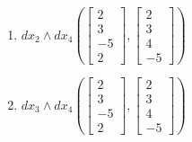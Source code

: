 \begin{question}
\begin{enumerate}
  \item[(e)] $dx_2\wedge dx_4\left(\begin{bmatrix}2\\3\\-5\\2\end{bmatrix},\begin{bmatrix}2\\3\\4\\-5\end{bmatrix}\right)$
  \item[(f)] $dx_3\wedge dx_4\left(\begin{bmatrix}2\\3\\-5\\2\end{bmatrix},\begin{bmatrix}2\\3\\4\\-5\end{bmatrix}\right)$
\end{enumerate}
\end{question}

